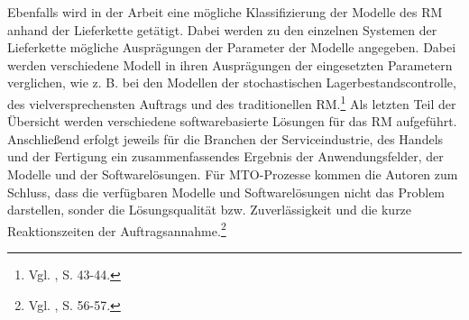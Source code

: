 Ebenfalls wird in der Arbeit eine mögliche Klassifizierung der Modelle des RM anhand der Lieferkette getätigt. Dabei werden zu den einzelnen Systemen der Lieferkette mögliche Ausprägungen der Parameter der Modelle angegeben. Dabei werden verschiedene Modell in ihren Ausprägungen der eingesetzten Parametern verglichen, wie z. B. bei den Modellen der stochastischen Lagerbestandscontrolle, des \glqq vielversprechensten Auftrags{\grqq} und des traditionellen RM.\footnote{Vgl. \cite{quante2009revenue}, S. 43-44.} Als letzten Teil der Übersicht werden verschiedene softwarebasierte Lösungen für das RM aufgeführt. Anschließend erfolgt jeweils für die Branchen der Serviceindustrie, des Handels und der Fertigung ein zusammenfassendes Ergebnis der Anwendungsfelder, der Modelle und der Softwarelösungen. Für MTO-Prozesse kommen die Autoren zum Schluss, dass die verfügbaren Modelle und Softwarelösungen nicht das Problem darstellen, sonder die Lösungsqualität bzw. Zuverlässigkeit und die kurze Reaktionszeiten der Auftragsannahme.\footnote{Vgl. \cite{quante2009revenue}, S. 56-57.}

